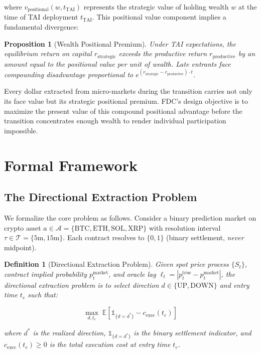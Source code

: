 \documentclass[11pt,a4paper]{article}
\newcommand{\EV}{\mathbb{E}}
\newtheorem{definition}{Definition}[section]
\newtheorem{proposition}{Proposition}[section]
\begin{document}
\noindent where $v_{\text{positional}}(w, t_{\text{TAI}})$ represents the strategic value of holding wealth $w$ at the time of TAI deployment $t_{\text{TAI}}$. This positional value component implies a fundamental divergence:

\begin{proposition}[Wealth Positional Premium]
\label{prop:positional}
Under TAI expectations, the equilibrium return on capital $r_{\text{strategic}}$ exceeds the productive return $r_{\text{productive}}$ by an amount equal to the positional value per unit of wealth. Late entrants face compounding disadvantage proportional to $e^{(r_{\text{strategic}} - r_{\text{productive}}) \cdot t}$.
\end{proposition}

Every dollar extracted from micro-markets during the transition carries not only its face value but its strategic positional premium. FDC's design objective is to maximize the present value of this compound positional advantage before the transition concentrates enough wealth to render individual participation impossible.

\section{Formal Framework}\label{sec:formal}

\subsection{The Directional Extraction Problem}

We formalize the core problem as follows. Consider a binary prediction market on crypto asset $a \in \mathcal{A} = \{\text{BTC}, \text{ETH}, \text{SOL}, \text{XRP}\}$ with resolution interval $\tau \in \mathcal{T} = \{5\text{m}, 15\text{m}\}$. Each contract resolves to $\{0, 1\}$ (binary settlement, \emph{never} midpoint).

\begin{definition}[Directional Extraction Problem]
Given spot price process $\{S_t\}$, contract implied probability $p_t^{\text{market}}$, and oracle lag $\ell_t = |p_t^{\text{true}} - p_t^{\text{market}}|$, the \emph{directional extraction problem} is to select direction $d \in \{\text{UP}, \text{DOWN}\}$ and entry time $t_e$ such that:

\begin{equation}\label{eq:extraction_objective}
    \max_{d, t_e} \; \EV\left[\mathbb{1}_{\{d = d^*\}} - c_{\text{exec}}(t_e)\right]
\end{equation}

\noindent where $d^*$ is the realized direction, $\mathbb{1}_{\{d = d^*\}}$ is the binary settlement indicator, and $c_{\text{exec}}(t_e) \geq 0$ is the total execution cost at entry time $t_e$.
\end{definition}
\end{document}
